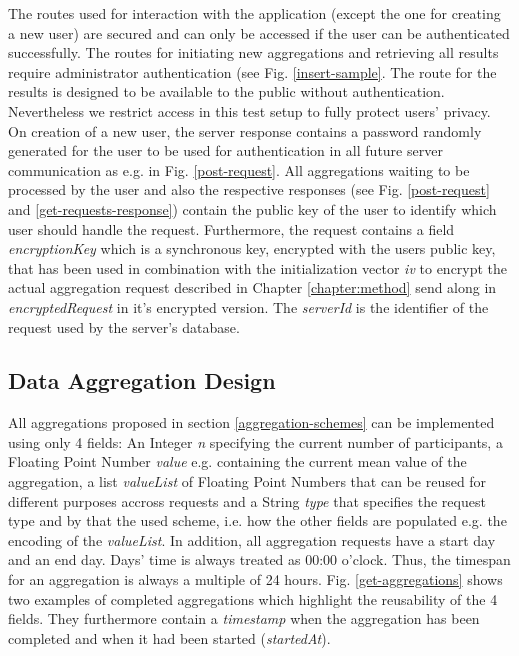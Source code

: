 
The routes used for interaction with the application (except the one for creating a new user) are secured and can only be accessed if the user can be authenticated successfully. The routes for initiating new aggregations and retrieving all results require administrator authentication (see Fig. \ref{insert-sample}. The route for the results is designed to be available to the public without authentication. Nevertheless we restrict access in this test setup to fully protect users' privacy.
On creation of a new user, the server response contains a password randomly generated for the user to be used for authentication in all future server communication as e.g. in Fig. \ref{post-request}. All aggregations waiting to be processed by the user and also the respective responses (see Fig. \ref{post-request} and \ref{get-requests-response}) contain the public key of the user to identify which user should handle the request. Furthermore, the request contains a field \textit{encryptionKey} which is a synchronous key, encrypted with the users public key, that has been used in combination with the initialization vector \textit{iv} to encrypt the actual aggregation request described in Chapter \ref{chapter:method} send along in \textit{encryptedRequest} in it's encrypted version. The \textit{serverId} is the identifier of the request used by the server's database.


\subsection{Data Aggregation Design}\label{data-aggregation-design}
All aggregations proposed in section \ref{aggregation-schemes} can be implemented using only 4 fields: An Integer \textit{n} specifying the current number of participants, a Floating Point Number \textit{value} e.g. containing the current mean value of the aggregation, a list \textit{valueList} of Floating Point Numbers that can be reused for different purposes accross requests and a String \textit{type} that specifies the request type and by that the used scheme, i.e. how the other fields are populated e.g. the encoding of the \textit{valueList}. In addition, all aggregation requests have a start day and an end day. Days' time is always treated as 00:00 o'clock. Thus, the timespan for an aggregation is always a multiple of 24 hours. Fig. \ref{get-aggregations} shows two examples of completed aggregations which highlight the reusability of the 4 fields. They furthermore contain a \textit{timestamp} when the aggregation has been completed and when it had been started (\textit{startedAt}).\\

